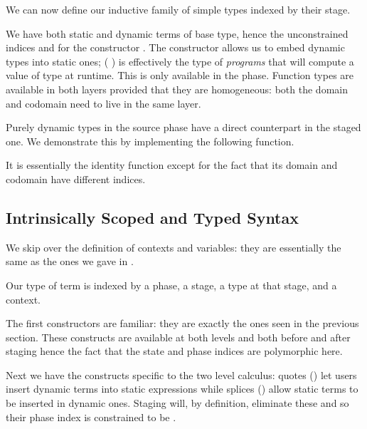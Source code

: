 \documentclass{article}
\begin{document}
We can now define our inductive family of simple types indexed
by their stage.


We have both static and dynamic terms of base type,
hence the unconstrained indices  and 
for the constructor .
%
The constructor  allows us to embed dynamic
types into static ones; ( ) is effectively
the type of \emph{programs} that will compute a value of
type  at runtime. This is only available in the
 phase.
%
Function types are available in both layers provided that
they are homogeneous: both the domain and codomain need
to live in the same layer.

Purely dynamic types in the source phase have a direct
counterpart in the staged one. We demonstrate this by
implementing the following  function.


It is essentially the identity function except for the
fact that its domain and codomain have different indices.

\subsection{Intrinsically Scoped and Typed Syntax}

We skip over the definition of contexts and variables: they
are essentially the same as the ones we gave in .

Our type of term is indexed by a phase, a stage, a type
at that stage, and a context.


The first constructors are familiar: they are exactly the ones
seen in the previous section. These constructs are available
at both levels and both before and after staging hence the fact
that the state and phase indices are polymorphic here.


Next we have the constructs specific to the two level calculus:
quotes () let users insert dynamic terms into static
expressions while splices () allow static terms to
be inserted in dynamic ones.
%
Staging will, by definition, eliminate these and so their phase
index is constrained to be .

\end{document}
